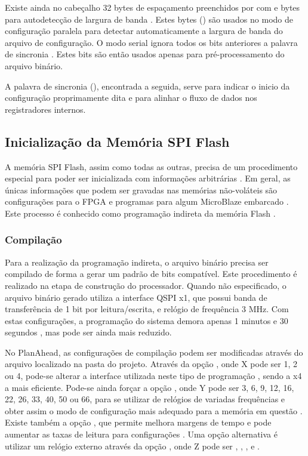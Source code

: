 \documentclass[11pt,a4paper,oneside]{book}
\begin{document}
Existe ainda no cabeçalho 32 bytes de espaçamento preenchidos por com  e bytes para autodetecção de largura de banda \cite{ug470, xapp583}.
Estes bytes () são usados no modo de configuração paralela para detectar automaticamente a largura de banda do arquivo de configuração.
O modo serial ignora todos os bits anteriores a palavra de sincronia \cite{xapp583}.
Estes bits são então usados apenas para pré-processamento do arquivo binário.

A palavra de sincronia (), encontrada a seguida, serve para indicar o inicio da configuração proprimamente dita e para alinhar o fluxo de dados nos registradores internos.

\subsection{Inicialização da Memória SPI Flash}
\label{sec:flash_indireta}
A memória SPI Flash, assim como todas as outras, precisa de um procedimento especial para poder ser inicializada com informações arbitrárias \cite{xapp694}.
Em geral, as únicas informações que podem ser gravadas nas memórias não-voláteis são configurações para o FPGA e programas para algum MicroBlaze embarcado \cite{ug111}.
Este processo é conhecido como programação indireta da memória Flash \cite{xapp586}.

\subsubsection{Compilação} Para a realização da programação indireta, o arquivo binário precisa ser compilado de forma a gerar um padrão de bits compatível.
Este procedimento é realizado na etapa de construção do processador.
Quando não especificado, o arquivo binário gerado utiliza a interface QSPI x1, que possui banda de transferência de 1 bit por leitura/escrita,  e relógio de frequência 3 MHz.
Com estas configurações, a programação do sistema demora apenas 1 minutos e 30 segundos \cite{xapp586}, mas pode ser ainda mais reduzido.

No PlanAhead, as configurações de compilação podem ser modificadas através do arquivo  localizado na pasta  do projeto.
Através da opção , onde X pode ser 1, 2 ou 4, pode-se alterar a interface utilizada neste tipo de programação \cite{ug628, xapp576}, sendo a x4 a mais eficiente.
Pode-se ainda forçar a opção , onde Y pode ser 3, 6, 9, 12, 16, 22, 26, 33, 40, 50 ou 66, para se utilizar de relógios de variadas frequências e obter assim o modo de configuração mais adequado para a memória em questão \cite{xapp586, ug628, ug810}.
Existe também a opção , que permite melhora margens de tempo e pode aumentar as taxas de leitura para configurações \cite{ug628, ug586}.
Uma opção alternativa é utilizar um relógio externo através da opção , onde Z pode ser , , ,  e .
\end{document}
